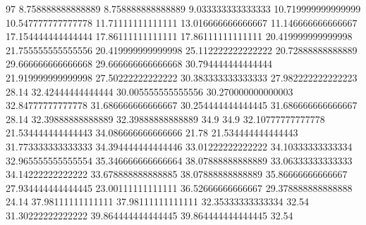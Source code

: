 97 8.758888888888889 8.758888888888889 9.033333333333333 10.719999999999999 10.547777777777778 11.71111111111111 13.016666666666667 11.146666666666667 17.154444444444444 17.86111111111111 17.86111111111111 20.419999999999998 21.755555555555556 20.419999999999998 25.112222222222222 20.72888888888889 29.666666666666668 29.666666666666668 30.794444444444444 21.919999999999998 27.50222222222222 30.383333333333333 27.982222222222223 28.14 32.42444444444444 30.005555555555556 30.270000000000003 32.84777777777778 31.686666666666667 30.254444444444445 31.686666666666667 28.14 32.39888888888889 32.39888888888889 34.9 34.9 32.10777777777778 21.534444444444443 34.086666666666666 21.78 21.534444444444443 31.773333333333333 34.394444444444446 33.01222222222222 34.10333333333334 32.965555555555554 35.346666666666664 38.07888888888889 33.06333333333333 34.14222222222222 33.678888888888885 38.07888888888889 35.86666666666667 27.934444444444445 23.00111111111111 36.52666666666667 29.378888888888888 24.14 37.98111111111111 37.98111111111111 32.35333333333334 32.54 31.30222222222222 39.864444444444445 39.864444444444445 32.54
